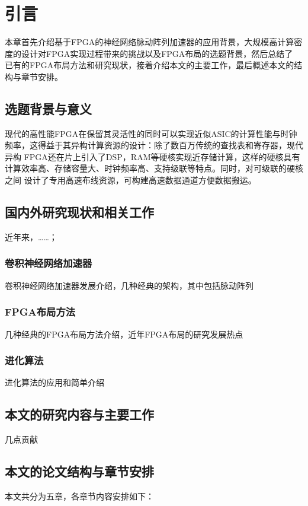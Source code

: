 \chapter{引言}

本章首先介绍基于FPGA的神经网络脉动阵列加速器的应用背景，大规模高计算密度的设计对FPGA实现过程带来的挑战以及FPGA布局的选题背景，然后总结了
已有的FPGA布局方法和研究现状，接着介绍本文的主要工作，最后概述本文的结构与章节安排。

\label{cha:introduction}
\section{选题背景与意义}
\label{sec:background}


现代的高性能FPGA在保留其灵活性的同时可以实现近似ASIC的计算性能与时钟频率，这得益于其异构计算资源的设计：除了数百万传统的查找表和寄存器，现代异构
FPGA还在片上引入了DSP，RAM等硬核实现近存储计算，这样的硬核具有计算效率高、存储容量大、时钟频率高、支持级联等特点。同时，对可级联的硬核之间
设计了专用高速布线资源，可构建高速数据通道方便数据搬运。


% 

\section{国内外研究现状和相关工作}
\label{sec:related_work}
近年来，……；


\subsection{卷积神经网络加速器}
卷积神经网络加速器发展介绍，几种经典的架构，其中包括脉动阵列

\subsection{FPGA布局方法}
几种经典的FPGA布局方法介绍，近年FPGA布局的研究发展热点

\subsection{进化算法}
进化算法的应用和简单介绍


\section{本文的研究内容与主要工作}
几点贡献

\section{本文的论文结构与章节安排}
\label{sec:arrangement}
本文共分为五章，各章节内容安排如下：

